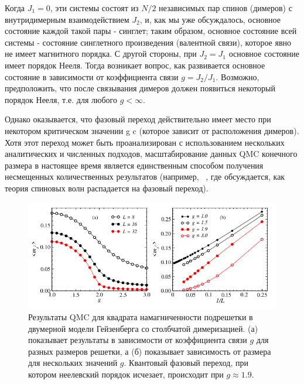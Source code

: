 \documentclass[11pt]{article}
\begin{document}
Когда $J_1 = 0$, эти системы состоят из $N/2$ независимых пар спинов (димеров) с внутридимерным взаимодействием $J_2$, и, как мы уже обсуждалось, основное состояние каждой такой пары - синглет; таким образом, основное состояние всей системы - состояние синглетного произведения (валентной связи), которое явно не имеет магнитного порядка. С другой стороны, при $J_2 = J_1$ основное состояние имеет порядок Нееля. Тогда возникает вопрос, как развивается основное состояние в зависимости от коэффициента связи $g = J_2 / J_1$. Возможно, предположить, что после связывания димеров должен появиться некоторый порядок Нееля, т.е. для любого $g < \infty$.

Однако оказывается, что фазовый переход действительно имеет место при некотором критическом значении g c (которое зависит от расположения димеров). Хотя этот переход может быть проанализирован с использованием нескольких аналитических и численных подходов, масштабирование данных QMC конечного размера в настоящее время является единственным способом получения несмещенных количественных результатов (например, ~\cite{prb_52_3521}, где обсуждается, как теория спиновых волн распадается на фазовый переход).

\begin{figure}[htp]
\centering
\includegraphics[scale=0.5]{fig5}
\caption{Результаты QMC для квадрата намагниченности подрешетки в двумерной модели Гейзенберга со столбчатой димеризацией. (а) показывает результаты в зависимости от коэффициента связи $g$ для разных размеров решетки, а (б) показывает зависимость от размера для нескольких значений $g$. Квантовый фазовый переход, при котором неелевский порядок исчезает, происходит при $g ≈ 1.9$.}
\label{}
\end{figure}
\end{document}
